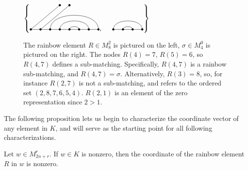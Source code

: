 \documentclass{amsart}
\begin{document}
\begin{figure} 
	\def\cbasisspacing{5mm}
	$\cbr{
		\begin{gathered}
		\GeneralizedMatching{8}{3/8, 4/7, 5/6}{2}{1/1,2/2}{5/4}, \hspace{\cbasisspacing}
		\Matching{4}{1/4, 2/3}
		\end{gathered}}$
	\caption{The rainbow element $R\in M_8^2$ is pictured on the left, $\sigma\in M_4^0$ is pictured on the right. The nodes $R(4)=7$, $R(5)=6$, so $R(4,7)$ defines a sub-matching. Specifically, $R(4,7)$ is a rainbow sub-matching, and $R(4,7)=\sigma$. Alternatively, $R(3)=8$, so, for instance $R(2,7)$ is not a sub-matching, and refers to the ordered set $(2,8,7,6,5,4)$. $R(2,1)$ is an element of the zero representation since $2>1$.}
	\label{sub-matching example}
\end{figure}

The following proposition lets us begin to characterize the coordinate vector of any element in $K$, and will serve as the starting point for all following characterizations.


\begin{proposition}
	Let $w\in M_{2n+r}^r$. If $w\in K$ is nonzero, then the coordinate of the rainbow element $R$ in $w$ is nonzero.
	
	\label{rainbow nonzero}
\end{proposition}	
\end{document}
